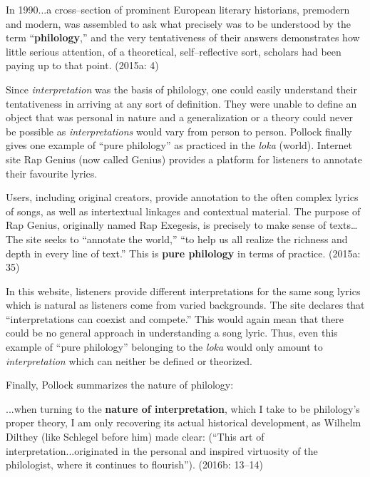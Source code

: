 \begin{myquote}
In 1990...a cross–section of prominent European literary historians, premodern and modern, was assembled to ask what precisely was to be understood by the term “\textbf{philology},” and the very tentativeness of their answers demonstrates how little serious attention, of a theoretical, self–reflective sort, scholars had been paying up to that point. (2015a: 4)
\end{myquote}

Since \textit{interpretation} was the basis of philology, one could easily understand their tentativeness in arriving at any sort of definition. They were unable to define an object that was personal in nature and a generalization or a theory could never be possible as \textit{interpretations} would vary from person to person. Pollock finally gives one example of “pure philology” as practiced in the \textit{loka} (world). Internet site Rap Genius (now called Genius) provides a platform for listeners to annotate their favourite lyrics.

\begin{myquote}
Users, including original creators, provide annotation to the often complex lyrics of songs, as well as intertextual linkages and contextual material. The purpose of Rap Genius, originally named Rap Exegesis, is precisely to make sense of texts… The site seeks to “annotate the world,” “to help us all realize the richness and depth in every line of text.” This is \textbf{pure philology} in terms of practice. (2015a: 35)
\end{myquote}

In this website, listeners provide different interpretations for the same song lyrics which is natural as listeners come from varied backgrounds. The site declares that “interpretations can coexist and compete.” This would again mean that there could be no general approach in understanding a song lyric. Thus, even this example of “pure philology” belonging to the \textit{loka} would only amount to \textit{interpretation} which can neither be defined or theorized.

Finally, Pollock summarizes the nature of philology:

\begin{myquote}
...when turning to the \textbf{nature of interpretation}, which I take to be philology’s proper theory, I am only recovering its actual historical development, as Wilhelm Dilthey (like Schlegel before him) made clear: (“This art of interpretation...originated in the personal and inspired virtuosity of the philologist, where it continues to flourish”). (2016b: 13–14)
\end{myquote}

